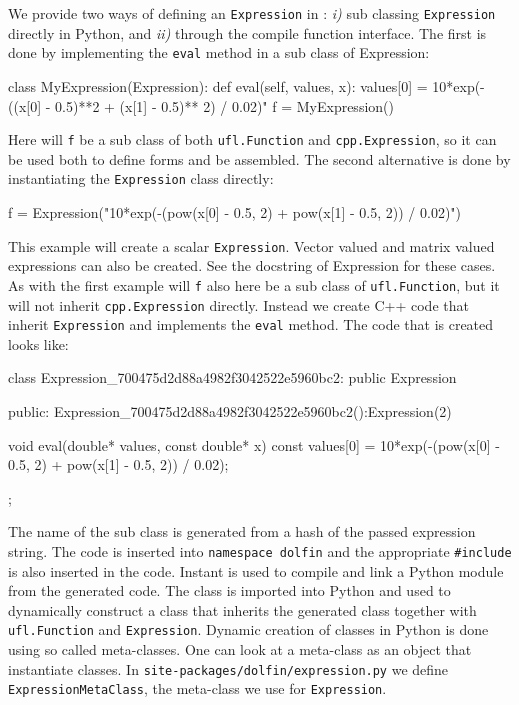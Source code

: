 We provide two ways of defining an \texttt{Expression} in \pydolfin: \textit{i)} sub classing \texttt{Expression} directly in Python, and \textit{ii)} through the compile function interface. The first is done by implementing the \texttt{eval} method in a sub class of Expression:
\begin{python}
class MyExpression(Expression):
    def eval(self, values, x):
        values[0] = 10*exp(-((x[0] - 0.5)**2 + (x[1] - 0.5)** 2) / 0.02)"
f = MyExpression()
\end{python}
Here will \texttt{f} be a sub class of both \texttt{ufl.Function} and \texttt{cpp.Expression}, so it can be used both to define \ufl forms and be assembled. The second alternative is done by instantiating the \texttt{Expression} class directly:
\begin{c++}
f = Expression("10*exp(-(pow(x[0] - 0.5, 2) + pow(x[1] - 0.5, 2)) / 0.02)")
\end{c++}
This example will create a scalar \texttt{Expression}. Vector valued and matrix valued expressions can also be created. See the docstring of Expression for these cases. As with the first example will \texttt{f} also here be a sub class of \texttt{ufl.Function}, but it will not inherit \texttt{cpp.Expression} directly. Instead we create C++ code that inherit \texttt{Expression} and implements the \texttt{eval} method. The code that is created looks like:
\begin{c++}
class Expression_700475d2d88a4982f3042522e5960bc2: public Expression{
public:
  Expression_700475d2d88a4982f3042522e5960bc2():Expression(2){}

  void eval(double* values, const double* x) const{
    values[0] = 10*exp(-(pow(x[0] - 0.5, 2) + pow(x[1] - 0.5, 2)) / 0.02);
  }
};
\end{c++}
The name of the sub class is generated from a hash of the passed expression string. The code is inserted into \texttt{namespace dolfin} and the appropriate \texttt{\#include} is also inserted in the code. Instant is used to compile and link a Python module from the generated code. The class is imported into Python and used to dynamically construct a class that inherits the generated class together with \texttt{ufl.Function} and \texttt{Expression}. Dynamic creation of classes in Python is done using so called meta-classes. One can look at a meta-class as an object that instantiate classes. In \texttt{site-packages/dolfin/expression.py} we define \texttt{ExpressionMetaClass}, the meta-class we use for \texttt{Expression}.\par


